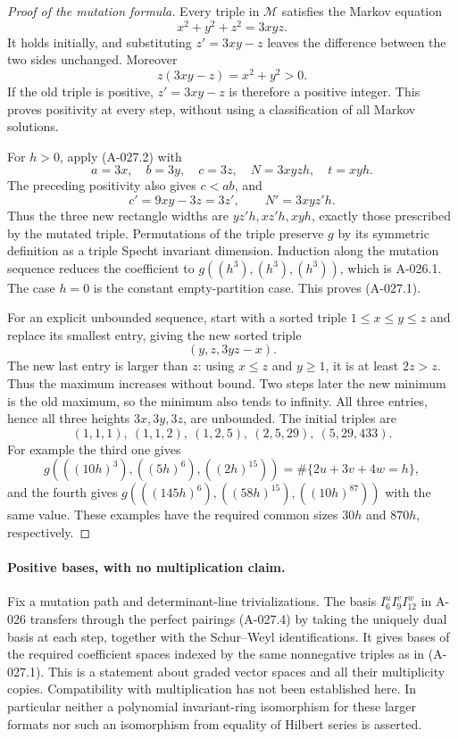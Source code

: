 \begin{proof}[Proof of the mutation formula]
Every triple in $\mathcal M$ satisfies the Markov equation
\[
                         x^2+y^2+z^2=3xyz.              \tag{A-027.5}
\]
It holds initially, and substituting $z'=3xy-z$ leaves
the difference between the two sides unchanged. Moreover
\[
                          z(3xy-z)=x^2+y^2>0.
\]
If the old triple is positive, $z'=3xy-z$ is therefore
a positive integer. This proves positivity at every step,
without using a classification of all Markov solutions.

For $h>0$, apply (A-027.2) with
\[
 a=3x,\quad b=3y,\quad c=3z,\quad
       N=3xyz h,\quad t=xyh.
\]
The preceding positivity also gives $c<ab$, and
\[
             c'=9xy-3z=3z',\qquad N'=3xyz'h.
\]
Thus the three new rectangle widths are $yz'h,xz'h,xyh$,
exactly those prescribed by the mutated triple. Permutations
of the triple preserve $g$ by its symmetric definition as
a triple Specht invariant dimension. Induction along the
mutation sequence reduces the coefficient to
$g((h^3),(h^3),(h^3))$, which is A-026.1.
The case $h=0$ is the constant empty-partition case.
This proves (A-027.1).

For an explicit unbounded sequence, start with a sorted
triple $1\leq x\leq y\leq z$ and replace its smallest
entry, giving the new sorted triple
\[
                            (y,z,3yz-x).
\]
The new last entry is larger than $z$: using $x\leq z$
and $y\geq1$, it is at least $2z>z$.
Thus the maximum increases without bound. Two steps later
the new minimum is the old maximum, so the minimum also
tends to infinity. All three entries, hence all three
heights $3x,3y,3z$, are unbounded. The initial triples are
\[
 (1,1,1),\ (1,1,2),\ (1,2,5),\ (2,5,29),\ (5,29,433).
\]
For example the third one gives
\[
       g(((10h)^3),((5h)^6),((2h)^{15}))
                         =\#\{2u+3v+4w=h\},
\]
and the fourth gives
$g(((145h)^6),((58h)^{15}),((10h)^{87}))$ with the
same value. These examples have the required common sizes
$30h$ and $870h$, respectively.
\end{proof}

\paragraph{Positive bases, with no multiplication claim.}
Fix a mutation path and determinant-line trivializations.
The basis $I_6^uI_9^vI_{12}^w$ in A-026 transfers through
the perfect pairings (A-027.4) by taking the uniquely dual
basis at each step, together with the Schur--Weyl
identifications. It gives bases of the required coefficient
spaces indexed by the same nonnegative triples as in
(A-027.1). This is a statement about graded vector spaces
and all their multiplicity copies. Compatibility with
multiplication has not been established here. In particular
neither a polynomial invariant-ring isomorphism for these
larger formats nor such an isomorphism from equality of
Hilbert series is asserted.

